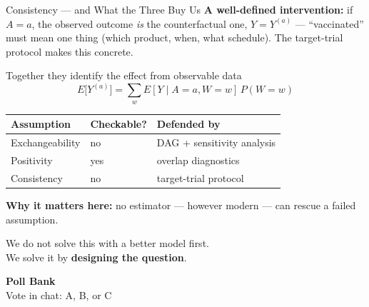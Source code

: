 \documentclass[aspectratio=169]{beamer}
\begin{document}
\begin{frame}{Consistency --- and What the Three Buy Us}
  \small
  \textbf{A well-defined intervention:} if \(A = a\), the observed
  outcome \emph{is} the counterfactual one, \(Y = Y^{(a)}\) ---
  ``vaccinated'' must mean one thing (which product, when, what
  schedule). The target-trial protocol makes this concrete.
  \vspace{0.4em}

  \begin{block}{Together they identify the effect from observable data}
    \vspace{-0.6em}
    \[
      E\big[Y^{(a)}\big] = \sum_{w} E[Y \mid A=a, W=w]\, P(W=w)
    \]
  \end{block}
  \vspace{0.3em}

  \begin{center}
    \begin{tabular}{@{}lll@{}}
      \toprule
      \textbf{Assumption} & \textbf{Checkable?} & \textbf{Defended by} \\
      \midrule
      Exchangeability & \textcolor{brick}{no} & DAG + sensitivity analysis \\
      Positivity & \textcolor{good}{yes} & overlap diagnostics \\
      Consistency & \textcolor{brick}{no} & target-trial protocol \\
      \bottomrule
    \end{tabular}
  \end{center}
  \vspace{0.3em}
  \textcolor{accent}{\textbf{Why it matters here:}} no estimator ---
  however modern --- can rescue a failed assumption.
\end{frame}

\begin{frame}[standout]
  We do not solve this with a better model first.\\[0.8em]
  We solve it by \textbf{designing the question}.
\end{frame}


\begin{frame}[plain]
  \centering
  \vfill
  {\color{inkdark}\textbf{\Large Poll Bank}}\\[0.6em]
  {\normalsize Vote in chat: A, B, or C}
  \vfill
\end{frame}
\end{document}
